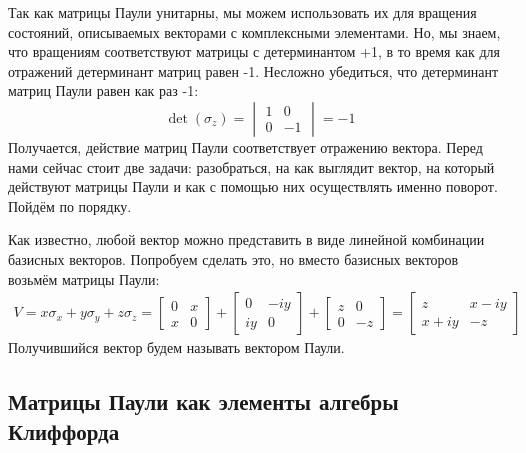 Так как матрицы Паули унитарны, мы можем использовать их для вращения состояний, описываемых векторами с комплексными элементами. Но, мы знаем, что вращениям соответствуют матрицы с детерминантом +1, в то время как для отражений детерминант матриц равен -1. Несложно убедиться, что детерминант матриц Паули равен как раз -1:
\[
\det(\sigma_z) = \begin{vmatrix} 1 & 0 \\ 0 & -1 \end{vmatrix} = -1 
\]
Получается, действие матриц Паули соответствует отражению вектора. Перед нами сейчас стоит две задачи: разобраться, на как выглядит вектор, на который действуют матрицы Паули и как с помощью них осуществлять именно поворот. Пойдём по порядку.

Как известно, любой вектор можно представить в виде линейной комбинации базисных векторов. Попробуем сделать это, но вместо базисных векторов возьмём матрицы Паули:
\begin{align*}
V = x\sigma_x + y\sigma_y + z\sigma_z = \begin{bmatrix} 0 & x \\ x & 0 \end{bmatrix} + \begin{bmatrix} 0 & -iy \\ iy & 0 \end{bmatrix} + \begin{bmatrix} z & 0 \\ 0 & -z \end{bmatrix} = \begin{bmatrix} z & x-iy \\ x+iy & -z \end{bmatrix}
\end{align*}
Получившийся вектор будем называть вектором Паули.
\subsection{Матрицы Паули как элементы алгебры Клиффорда}